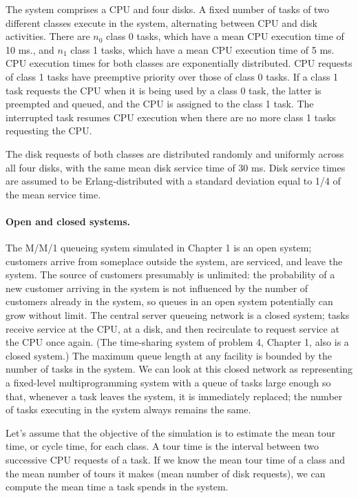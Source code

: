 The system comprises a CPU and four disks. A fixed number of tasks of two
different classes execute in the system, alternating between CPU and disk
activities. There are $n_0$ class 0 tasks, which have a mean CPU execution time
of 10 ms., and $n_1$ class 1 tasks, which have a mean CPU execution time of
5 ms. CPU execution times for both classes are exponentially distributed. CPU
requests of class 1 tasks have preemptive priority over those of class 0 tasks.
If a class 1 task requests the CPU when it is being used by a class 0 task, the
latter is preempted and queued, and the CPU is assigned to the class 1 task.
The interrupted task resumes CPU execution when there are no more class 1
tasks requesting the CPU.

The disk requests of both classes are distributed randomly and uniformly
across all four disks, with the same mean disk service time of 30 ms. Disk
service times are assumed to be Erlang-distributed with a standard deviation
equal to 1/4 of the mean service time.

\paragraph{Open and closed systems.}
The M/M/1 queueing system simulated in Chapter 1 is an open system; customers
arrive from someplace outside the system, are serviced, and leave the system.
The source of customers presumably is unlimited: the probability of a new
customer arriving in the system is not influenced by the number of customers
already in the system, so queues in an open system potentially can grow
without limit. The central server queueing network is a closed system; tasks
receive service at the CPU, at a disk, and then recirculate to request service
at the CPU once again. (The time-sharing system of problem 4, Chapter 1, also
is a closed system.) The maximum queue length at any facility is bounded by
the number of tasks in the system. We can look at this closed network as
representing a fixed-level multiprogramming system with a queue of tasks large
enough so that, whenever a task leaves the system, it is immediately replaced;
the number of tasks executing in the system always remains the same.

Let's assume that the objective of the simulation is to estimate the mean tour
time, or cycle time, for each class. A tour time is the interval between two
successive CPU requests of a task. If we know the mean tour time of a class
and the mean number of tours it makes (mean number of disk requests), we can
compute the mean time a task spends in the system.

